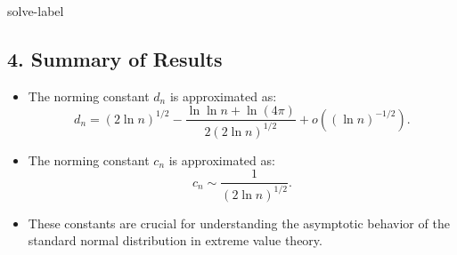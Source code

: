 \begin{solve}{}{solve-label}
\subsection*{4. Summary of Results}

\begin{itemize}
	\item The norming constant $d_n$ is approximated as:
	\[ 
	d_n = (2 \ln n)^{1/2} - \frac{\ln \ln n + \ln(4\pi)}{2(2 \ln n)^{1/2}} + o((\ln n)^{-1/2}). 
	\]
	
	\item The norming constant $c_n$ is approximated as:
	\[ 
	c_n \sim \frac{1}{(2 \ln n)^{1/2}}. 
	\]
	
	\item These constants are crucial for understanding the asymptotic behavior of the standard normal distribution in extreme value theory.
\end{itemize}

 \cite{Embrechts.etal1997}
	\end{solve}
	
	
	
	
	
